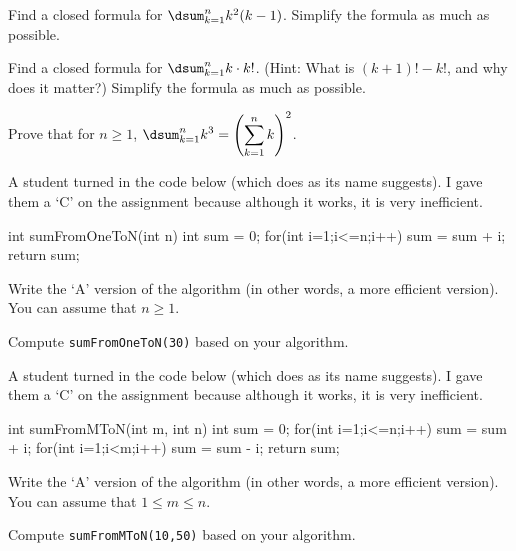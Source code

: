 \begin{pro}
Find a closed formula for $\dsum _{k=1}^n k^2(k-1)$. 
Simplify the formula as much as possible.
\end{pro}

\begin{pro}
Find a closed formula for $\dsum _{k=1}^n k\cdot k!$. 
(Hint: What is $(k+1)! - k!$, and why does it matter?)
Simplify the formula as much as possible.

\end{pro}

\begin{pro}
Prove that for $n\geq 1$, 
$\displaystyle \dsum_{k=1}^{n} k^3 = \left(\sum_{k=1}^{n} k \right)^2$.
\end{pro}


\begin{pro}
A student turned in the code below (which does as its name suggests).  
I gave them a `C' on the assignment because although it works,
it is very inefficient. 
\begin{code}
	int sumFromOneToN(int n) {
	    int sum = 0;
	    for(int i=1;i<=n;i++) {
	        sum = sum + i;
	    }
	return sum;
	}
\end{code}
\begin{lenum}
\item
Write the `A' version of the algorithm (in other words, a more efficient version).
You can assume that $n\geq 1$.  
\item 
Compute \verb+sumFromOneToN(30)+ based on your algorithm.
\end{lenum}
\end{pro}

\newpage
\begin{pro}
A student turned in the code below (which does as its name suggests).  
I gave them a `C' on the assignment because although it works,
it is very inefficient.
\begin{code}
	int sumFromMToN(int m, int n) {
	    int sum = 0;
	    for(int i=1;i<=n;i++) {
	        sum = sum + i;
	    }
	    for(int i=1;i<m;i++) {
	        sum = sum - i;
	    }
	    return sum;
	}
\end{code}
\begin{lenum}
\item
Write the `A' version of the algorithm (in other words, a more efficient version).
You can assume that $1\leq m\leq n$.
\item 
Compute \verb+sumFromMToN(10,50)+ based on your algorithm.
\end{lenum}
\end{pro}

